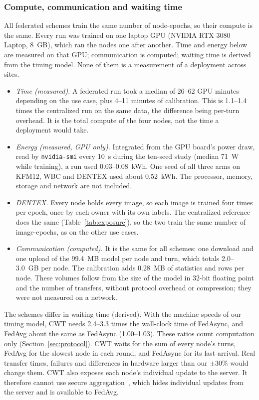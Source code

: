 \documentclass[pdflatex,sn-mathphys-num]{sn-jnl}
\begin{document}
\subsubsection{Compute, communication and waiting time}
All federated schemes train the same number of node-epochs, so their compute is the same. Every run was trained on one laptop GPU (NVIDIA RTX 3080 Laptop, 8~GB), which ran the nodes one after another. Time and energy below are measured on that GPU; communication is computed; waiting time is derived from the timing model. None of them is a measurement of a deployment across sites.
\begin{itemize}
\item \emph{Time (measured).} A federated run took a median of 26--62 GPU minutes depending on the use case, plus 4--11 minutes of calibration. This is 1.1--1.4 times the centralized run on the same data, the difference being per-turn overhead. It is the total compute of the four nodes, not the time a deployment would take.
\item \emph{Energy (measured, GPU only).} Integrated from the GPU board's power draw, read by \texttt{nvidia-smi} every 10~s during the ten-seed study (median 71~W while training), a run used 0.03--0.08~kWh. One seed of all three arms on KFM12, WBC and DENTEX used about 0.52~kWh. The processor, memory, storage and network are not included.
\item \emph{DENTEX.} Every node holds every image, so each image is trained four times per epoch, once by each owner with its own labels. The centralized reference does the same (Table~\ref{tab:exposure}), so the two train the same number of image-epochs, as on the other use cases.
\item \emph{Communication (computed).} It is the same for all schemes: one download and one upload of the 99.4~MB model per node and turn, which totals 2.0--3.0~GB per node. The calibration adds 0.28~MB of statistics and rows per node. These volumes follow from the size of the model in 32-bit floating point and the number of transfers, without protocol overhead or compression; they were not measured on a network.
\end{itemize}
The schemes differ in waiting time (derived). With the machine speeds of our timing model, CWT needs 2.4--3.3 times the wall-clock time of FedAsync, and FedAvg about the same as FedAsync (1.00--1.03). These ratios count computation only (Section~\ref{sec:protocol}). CWT waits for the sum of every node's turns, FedAvg for the slowest node in each round, and FedAsync for its last arrival. Real transfer times, failures and differences in hardware larger than our $\pm30\%$ would change them. CWT also exposes each node's individual update to the server. It therefore cannot use secure aggregation~\cite{bonawitz2017secagg}, which hides individual updates from the server and is available to FedAvg.
\end{document}
